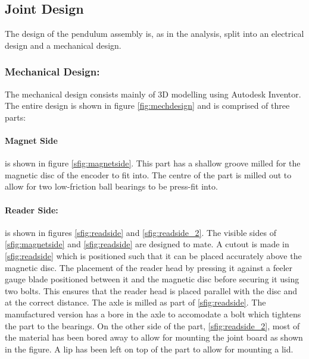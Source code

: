 \subsection{Joint Design} %
\label{sub:joint_design}
The design of the pendulum assembly is, as in the analysis, split into an electrical design and a mechanical design.


\subsubsection{Mechanical Design:} %
\label{ssub:mechanical_design}
The mechanical design consists mainly of 3D modelling using Autodesk Inventor.
The entire design is shown in figure \ref{fig:mechdesign} and is comprised of three parts:
\paragraph{Magnet Side} %
\label{par:magnet_side}
is shown in figure \ref{sfig:magnetside}. 
This part has a shallow groove milled for the magnetic disc of the encoder to fit into.
The centre of the part is milled out to allow for two low-friction ball bearings to be press-fit into.
\paragraph{Reader Side:} %
\label{par:reader_side}
is shown in figures \ref{sfig:readside} and \ref{sfig:readside_2}.
The visible sides of \ref{sfig:magnetside} and \ref{sfig:readside} are designed to mate.
A cutout is made in \ref{sfig:readside} which is positioned such that it can be placed accurately above the magnetic disc.
The placement of the reader head by pressing it against a feeler gauge blade positioned between it and the magnetic disc before securing it using two bolts.
This ensures that the reader head is placed parallel with the disc and at the correct distance.
The axle is milled as part of \ref{sfig:readside}.
The manufactured version has a bore in the axle to accomodate a bolt which tightens the part to the bearings.
On the other side of the part, \ref{sfig:readside_2}, most of the material has been bored away to allow for mounting the joint board as shown in the figure.
A lip has been left on top of the part to allow for mounting a lid.

